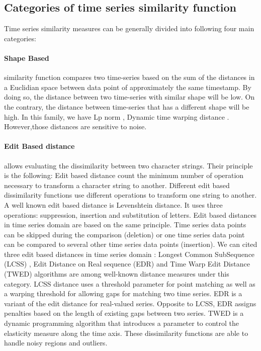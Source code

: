 \subsection{Categories of time series similarity function}


Time series similarity measures can be generally divided into following four main categories:


\paragraph{Shape Based} similarity function compares two time-series based on the sum of the distances in a Euclidian space between data point of approximately the same timestamp. By doing so, the distance between two time-series with similar shape will be low. On the contrary, the distance between time-series that has a different shape will be high. In this family, we have Lp norm \cite{yi2000fast, keogh2003need}, Dynamic time warping distance \cite{ MyersRabinerRosenberg1980}. However,those distances are sensitive to noise.

\paragraph{Edit Based distance} allows evaluating the dissimilarity between two character strings. Their principle is the following: Edit based distance count the minimum number of operation necessary to transform a character string to another. Different edit based dissimilarity functions use different operations to transform one string to another. A well known edit based distance is Levenshtein distance. It uses three operations: suppression, insertion and substitution of letters. Edit based distances in time series domain are based on the same principle. Time series data points can be skipped during the comparison (deletion) or one time series data point can be compared to several other time series data points (insertion). We can cited three edit based distances in time series domain : Longest Common SubSequence (LCSS) \cite{das1997finding}, Edit Distance on Real sequence (EDR) \cite{chen2005robust} and Time Warp Edit Distance (TWED) \cite{marteau2009time} algorithms are among well-known distance measures under this category. LCSS distance uses a threshold parameter for point matching as well as a warping threshold for allowing gaps for matching two time series. EDR is a variant of the edit distance for real-valued series. Opposite to LCSS, EDR assigns penalties based on the length of existing gaps between two series. TWED is a dynamic programming algorithm that introduces a parameter to control the elasticity measure along the time axis. These dissimilarity functions are able to handle noisy regions and outliers.

